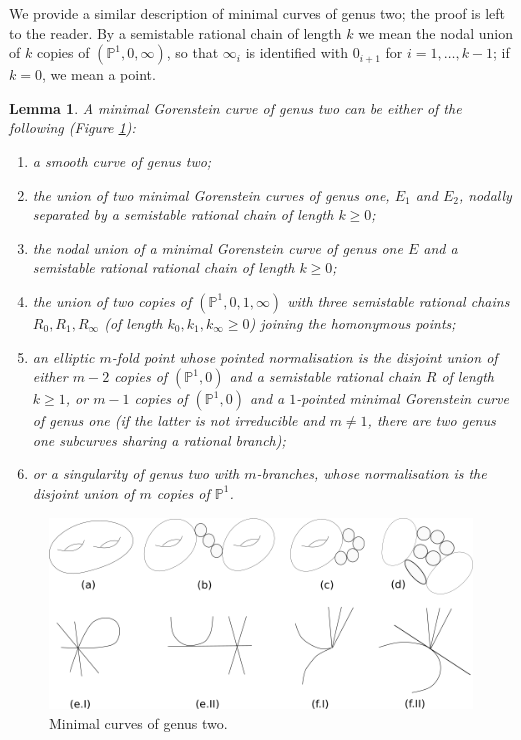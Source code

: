 \documentclass{compositio}
\newcommand{\PP}{\mathbb P}
\theoremstyle{plain}
\newtheorem{lem}[thm]{Lemma}
\theoremstyle{definition}
\theoremstyle{remark}
\begin{document}
We provide a similar description of minimal curves of genus two; the proof is left to the reader. By a semistable rational chain of length $k$ we mean the nodal union of $k$ copies of  $(\PP^1,0,\infty)$, so that $\infty_i$ is identified with $0_{i+1}$ for $i=1,\ldots,k-1$; if $k=0$, we mean a point.
\begin{lem}\label{lem:min2}
 A minimal Gorenstein curve of genus two can be either of the following (Figure \ref{fig:minimalcurves}):
 \begin{enumerate}[label=(\alph*)]
  \item a smooth curve of genus two;
  \item the union of two minimal Gorenstein curves of genus one, $E_1$ and $E_2$, nodally separated by a semistable rational chain of length $k\geq 0$;
  \item the nodal union of a minimal Gorenstein curve of genus one $E$ and a semistable rational rational chain of length $k\geq 0$;
  \item the union of two copies of $(\PP^1,0,1,\infty)$ with three semistable rational chains $R_0, R_1, R_\infty$ (of length $k_0,k_1,k_\infty\geq 0$) joining the homonymous points;
  \item\label{case:twice1} an elliptic $m$-fold point whose pointed normalisation is the disjoint union of either $m-2$ copies of $(\PP^1,0)$ and a semistable rational chain $R$ of length $k\geq 1$, or $m-1$ copies of $(\PP^1,0)$ and a $1$-pointed minimal Gorenstein curve of genus one (if the latter is not irreducible and $m\neq 1$, there are two genus one subcurves sharing a rational branch);
  \item\label{case:2} or a singularity of genus two with $m$-branches, whose normalisation is the disjoint union of $m$ copies of $\PP^1$.
 \end{enumerate}
\end{lem}

\begin{center}
 \begin{figure}
  \includegraphics[width=\textwidth]{minimalcurves}
  \caption{Minimal curves of genus two.}
\label{fig:minimalcurves}
 \end{figure}
\end{center}
\end{document}
